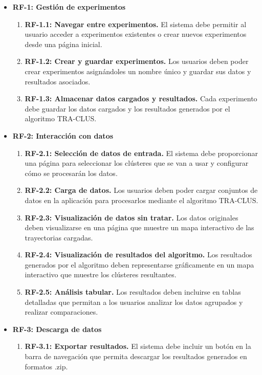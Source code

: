 \begin{itemize}

    \item \textbf{RF-1: Gestión de experimentos}
    \begin{enumerate}
        \item \textbf{RF-1.1: Navegar entre experimentos.}  
        El sistema debe permitir al usuario acceder a experimentos existentes o crear nuevos experimentos desde una página inicial.
        \item \textbf{RF-1.2: Crear y guardar experimentos.}  
        Los usuarios deben poder crear experimentos asignándoles un nombre único y guardar sus datos y resultados asociados.
        \item \textbf{RF-1.3: Almacenar datos cargados y resultados.}  
        Cada experimento debe guardar los datos cargados y los resultados generados por el algoritmo TRA-CLUS.
    \end{enumerate}

    \item \textbf{RF-2: Interacción con datos}
    \begin{enumerate}
        \item \textbf{RF-2.1: Selección de datos de entrada.}  
        El sistema debe proporcionar una página para seleccionar los clústeres que se van a usar y configurar cómo se procesarán los datos.
        \item \textbf{RF-2.2: Carga de datos.}  
        Los usuarios deben poder cargar conjuntos de datos en la aplicación para procesarlos mediante el algoritmo TRA-CLUS.
        \item \textbf{RF-2.3: Visualización de datos sin tratar.}  
        Los datos originales deben visualizarse en una página que muestre un mapa interactivo de las trayectorias cargadas.
        \item \textbf{RF-2.4: Visualización de resultados del algoritmo.}  
        Los resultados generados por el algoritmo deben representarse gráficamente en un mapa interactivo que muestre los clústeres resultantes.
        \item \textbf{RF-2.5: Análisis tabular.}  
        Los resultados deben incluirse en tablas detalladas que permitan a los usuarios analizar los datos agrupados y realizar comparaciones.
    \end{enumerate}
    
    \item \textbf{RF-3: Descarga de datos}
    \begin{enumerate}
        \item \textbf{RF-3.1: Exportar resultados.}  
        El sistema debe incluir un botón en la barra de navegación que permita descargar los resultados generados en formatos .zip.
    \end{enumerate}
    

\end{itemize}
